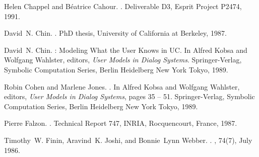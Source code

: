 \documentclass{kluwer}    %
\begin{document}
\begin{article}
\begin{thebibliography}{}
Helen Chappel and B\'eatrice Cahour.
.
\newblock Deliverable D3, Esprit Project P2474, 1991.

David~N. Chin.
.
\newblock PhD thesis, University of California at Berkeley, 1987.

David~N. Chin.
: {M}odeling {W}hat the {U}ser {K}nows in {UC}.
\newblock In Alfred Kobsa and Wolfgang Wahlster, editors, {\em User Models in
  Dialog Systems}. Springer-Verlag, Symbolic Computation Series, Berlin
  Heidelberg New York Tokyo, 1989.

Robin Cohen and Marlene Jones.
.
\newblock In Alfred Kobsa and Wolfgang Wahlster, editors, {\em User Models in
  Dialog Systems}, pages 35 -- 51. Springer-Verlag, Symbolic Computation
  Series, Berlin Heidelberg New York Tokyo, 1989.

Pierre Falzon.
.
\newblock Technical Report 747, INRIA, Rocquencourt, France, 1987.

Timothy~W. Finin, Aravind~K. Joshi, and Bonnie~Lynn Webber.
.
, 74(7), July 1986.

\end{thebibliography}
\end{article}
\end{document}
